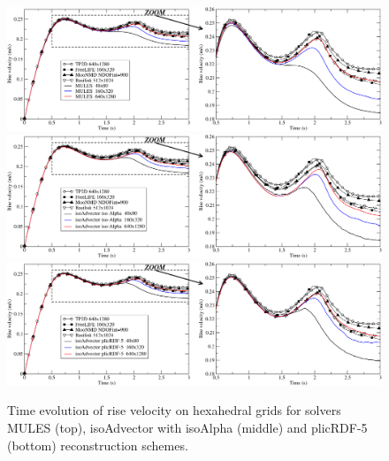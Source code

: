 \documentclass[review]{elsarticle}
\begin{document}
\begin{figure}[!h]
\begin{center}
 \vspace{-1mm}
 \includegraphics[width=\textwidth]{figures/HysingB_bubble_velocity_MULES.pdf}
 \includegraphics[width=\textwidth]{figures/HysingB_bubble_velocity_isoAlpha.pdf}
 \includegraphics[width=\textwidth]{figures/HysingB_bubble_velocity_plicRDF5.pdf}
 \vspace{-14mm}
\end{center}
\caption{Time evolution of rise velocity on hexahedral grids for solvers MULES (top), isoAdvector with isoAlpha (middle) and plicRDF-5 (bottom) reconstruction schemes.}
\label{fig:HB_Struct_bubble_velocity}
\end{figure}
\end{document}
